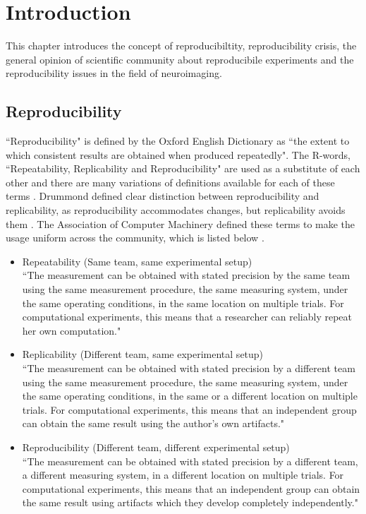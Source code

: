 \chapter{Introduction}
This chapter introduces the concept of reproducibiltity, reproducibility crisis, the general opinion of scientific community about reproducibile experiments and the reproducibility issues in the field of neuroimaging. 

\section{Reproducibility}

``Reproducibility" is defined by the Oxford English Dictionary as ``the extent to which consistent results are obtained when produced repeatedly". The R-words, ``Repeatability, Replicability and Reproducibility" are used as a substitute of each other and there are many variations of definitions available for each of these terms \cite{Plesser2018}. Drummond defined clear distinction between reproducibility and replicability, as reproducibility accommodates changes, but replicability avoids them \cite{Drummond}. The Association of Computer Machinery defined these terms to make the usage uniform across the community, which is listed below \cite{ACM2016}.

\begin{itemize}
\item {Repeatability (Same team, same experimental setup)\\}
      ``The measurement can be obtained with stated precision by the same team using the same measurement procedure, the same measuring system, under the same operating conditions, in the same location on multiple trials. For computational experiments, this means that a researcher can reliably repeat her own computation."
\item{Replicability (Different team, same experimental setup)\\}
      ``The measurement can be obtained with stated precision by a different team using the same measurement procedure, the same measuring system, under the same operating conditions, in the same or a different location on multiple trials. For computational experiments, this means that an independent group can obtain the same result using the author's own artifacts."
\item{Reproducibility (Different team, different experimental setup)\\}
      ``The measurement can be obtained with stated precision by a different team, a different measuring system, in a different location on multiple trials. For computational experiments, this means that an independent group can obtain the same result using artifacts which they develop completely independently."
\end{itemize}

